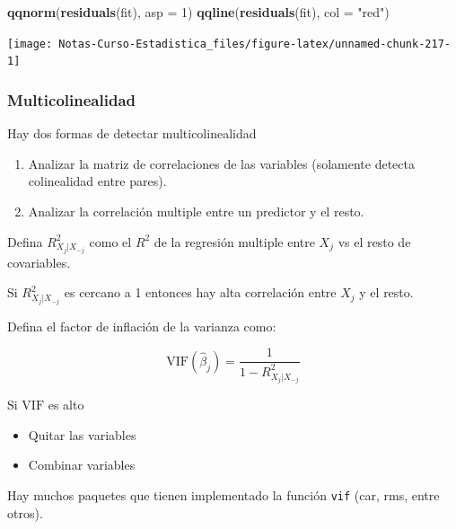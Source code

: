 \documentclass[
  12pt,
]{book}
\newenvironment{Shaded}{\begin{snugshade}}{\end{snugshade}}
\newcommand{\DataTypeTok}[1]{\textcolor[rgb]{0.13,0.29,0.53}{#1}}
\newcommand{\DecValTok}[1]{\textcolor[rgb]{0.00,0.00,0.81}{#1}}
\newcommand{\KeywordTok}[1]{\textcolor[rgb]{0.13,0.29,0.53}{\textbf{#1}}}
\newcommand{\NormalTok}[1]{#1}
\newcommand{\StringTok}[1]{\textcolor[rgb]{0.31,0.60,0.02}{#1}}
\providecommand{\tightlist}{%
  \setlength{\itemsep}{0pt}\setlength{\parskip}{0pt}}
\theoremstyle{definition}
\theoremstyle{definition}
\theoremstyle{definition}
\theoremstyle{remark}
\begin{document}
\begin{Shaded}
\begin{Highlighting}[]
\KeywordTok{qqnorm}\NormalTok{(}\KeywordTok{residuals}\NormalTok{(fit), }\DataTypeTok{asp =} \DecValTok{1}\NormalTok{)}
\KeywordTok{qqline}\NormalTok{(}\KeywordTok{residuals}\NormalTok{(fit), }\DataTypeTok{col =} \StringTok{"red"}\NormalTok{)}
\end{Highlighting}
\end{Shaded}

\begin{center}\texttt{[image: Notas-Curso-Estadistica\_files/figure-latex/unnamed-chunk-217-1]} \end{center}

\hypertarget{multicolinealidad}{%
\subsubsection{Multicolinealidad}\label{multicolinealidad}}

Hay dos formas de detectar multicolinealidad

\begin{enumerate}
\def\labelenumi{\arabic{enumi}.}
\item
  Analizar la matriz de correlaciones de las variables (solamente detecta colinealidad entre pares).
\item
  Analizar la correlación multiple entre un predictor y el resto.
\end{enumerate}

Defina \(R^{2}_{X_{j}\vert X_{-j}}\) como el \(R^{2}\) de la regresión multiple entre \(X_{j}\) vs el resto de covariables.

Si \(R^{2}_{X_{j}\vert X_{-j}}\) es cercano a 1 entonces hay alta correlación entre \(X_j\) y el resto.

Defina el factor de inflación de la varianza como:

\begin{equation*}
 \mathrm{VIF}(\hat{\beta}_{j}) = \frac{1}{1-R^{2}_{X_{j}\vert X_{-j}}}
\end{equation*}

Si \(\mathrm{VIF}\) es alto

\begin{itemize}
\tightlist
\item
  Quitar las variables
\item
  Combinar variables
\end{itemize}

Hay muchos paquetes que tienen implementado la función \texttt{vif} (car, rms, entre otros).
\end{document}

